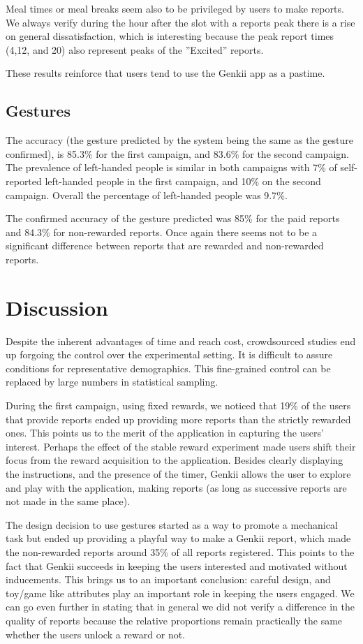 \documentclass[letterpaper]{article}
\begin{document}
Meal times or meal breaks seem also to be privileged by users to make reports. 
We always verify during the hour after the slot with a reports peak there is a rise on general dissatisfaction, which is interesting because the peak report times (4,12, and 20) also represent peaks of the ''Excited'' reports.

These results reinforce that users tend to use the Genkii app as a pastime. 

\subsection{Gestures} 
The accuracy (the gesture predicted by the system being the same as the gesture confirmed), is 85.3\% for the first campaign, and 83.6\% for the second campaign.
The prevalence of left-handed people is similar in both campaigns with 7\% of self-reported left-handed people in the first campaign, and 10\% on the second campaign. Overall the percentage of left-handed people was 9.7\%.

The confirmed accuracy of the gesture predicted was 85\% for the paid reports and 84.3\% for non-rewarded reports. Once again there seems not to be a significant difference between reports that are rewarded and non-rewarded reports.

\section{Discussion}

Despite the inherent advantages of time and reach cost, crowdsourced studies end up forgoing the control over the experimental setting. It is difficult to assure conditions for representative demographics. 
This fine-grained control can be replaced by large numbers in statistical sampling. 


During the first campaign, using fixed rewards, we noticed that 19\% of the users that provide reports ended up providing more reports than the strictly rewarded ones.
This points us to the merit of the application in capturing the users' interest. 
Perhaps the effect of the stable reward experiment made users shift their focus from the reward acquisition to the application. Besides clearly displaying the instructions, and the presence of the timer, Genkii allows the user to explore and play with the application, making reports (as long as successive reports are not made in the same place).

The design decision to use gestures started as a way to promote a mechanical task but ended up providing a playful way to make a Genkii report, which made the non-rewarded reports around 35\% of all reports registered. This points to the fact that Genkii succeeds in keeping the users interested and motivated without inducements. This brings us to an important conclusion: careful design, and toy/game like attributes play an important role in keeping the users engaged. We can go even further in stating that in general we did not verify a difference in the quality of reports because the relative proportions remain practically the same whether the users unlock a reward or not.
\end{document}
